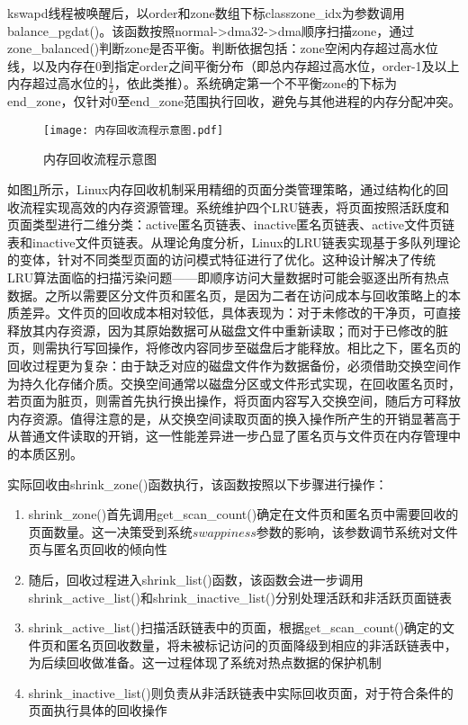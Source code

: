 kswapd线程被唤醒后，以order和zone数组下标classzone\_idx为参数调用balance\_pgdat()。该函数按照normal->dma32->dma顺序扫描zone，通过zone\_balanced()判断zone是否平衡。判断依据包括：zone空闲内存超过高水位线，以及内存在0到指定order之间平衡分布（即总内存超过高水位，order-1及以上内存超过高水位的\(\frac{1}{2}\)，依此类推）。系统确定第一个不平衡zone的下标为end\_zone，仅针对0至end\_zone范围执行回收，避免与其他进程的内存分配冲突。

\begin{figure}[htb]
    \centering
    \texttt{[image: 内存回收流程示意图.pdf]}
    \caption{内存回收流程示意图}
    \label{fig:memory_reclaim_mechanism}
\end{figure}

如图\ref{fig:memory_reclaim_mechanism}所示，Linux内存回收机制采用精细的页面分类管理策略，通过结构化的回收流程实现高效的内存资源管理。系统维护四个LRU链表，将页面按照活跃度和页面类型进行二维分类：active匿名页链表、inactive匿名页链表、active文件页链表和inactive文件页链表。从理论角度分析，Linux的LRU链表实现基于多队列理论的变体，针对不同类型页面的访问模式特征进行了优化。这种设计解决了传统LRU算法面临的扫描污染问题——即顺序访问大量数据时可能会驱逐出所有热点数据。之所以需要区分文件页和匿名页，是因为二者在访问成本与回收策略上的本质差异。文件页的回收成本相对较低，具体表现为：对于未修改的干净页，可直接释放其内存资源，因为其原始数据可从磁盘文件中重新读取；而对于已修改的脏页，则需执行写回操作，将修改内容同步至磁盘后才能释放。相比之下，匿名页的回收过程更为复杂：由于缺乏对应的磁盘文件作为数据备份，必须借助交换空间作为持久化存储介质。交换空间通常以磁盘分区或文件形式实现，在回收匿名页时，若页面为脏页，则需首先执行换出操作，将页面内容写入交换空间，随后方可释放内存资源。值得注意的是，从交换空间读取页面的换入操作所产生的开销显著高于从普通文件读取的开销，这一性能差异进一步凸显了匿名页与文件页在内存管理中的本质区别。

实际回收由shrink\_zone()函数执行，该函数按照以下步骤进行操作：

\begin{enumerate}
    \item shrink\_zone()首先调用get\_scan\_count()确定在文件页和匿名页中需要回收的页面数量。这一决策受到系统\(swappiness\)参数的影响，该参数调节系统对文件页与匿名页回收的倾向性

    \item 随后，回收过程进入shrink\_list()函数，该函数会进一步调用shrink\_active\_list()和shrink\_inactive\_list()分别处理活跃和非活跃页面链表

    \item shrink\_active\_list()扫描活跃链表中的页面，根据get\_scan\_count()确定的文件页和匿名页回收数量，将未被标记访问的页面降级到相应的非活跃链表中，为后续回收做准备。这一过程体现了系统对热点数据的保护机制

    \item shrink\_inactive\_list()则负责从非活跃链表中实际回收页面，对于符合条件的页面执行具体的回收操作
\end{enumerate}


